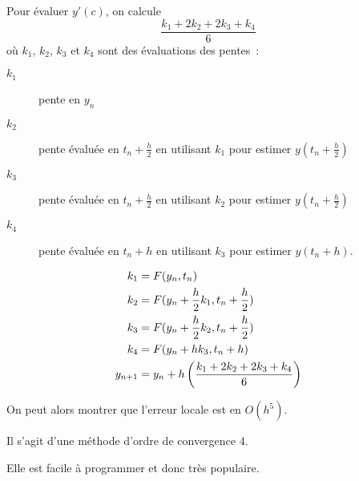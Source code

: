 Pour évaluer $y'(c)$, on calcule
\begin{equation*}
  \frac{k_{1} + 2 k_{2} + 2 k_{3} + k_{4}}{6}
\end{equation*}
où $k_{1}$, $k_{2}$, $k_{3}$ et $k_{4}$ sont des évaluations des
pentes~:
\begin{description}
\item[$k_{1}$] pente en $y_{n}$
\item[$k_2$] pente évaluée en $t_{n}+\frac{h}{2}$ en utilisant $k_{1}$
  pour estimer $y(t_{n}+\frac{h}{2})$
\item[$k_3$] pente évaluée en $t_{n}+\frac{h}{2}$ en utilisant $k_{2}$
  pour estimer $y(t_{n}+\frac{h}{2})$
\item[$k_4$] pente évaluée en $t_{n}+h$ en utilisant $k_{3}$ pour
  estimer $y(t_{n}+h)$.
\end{description}
\begin{align*}
  k_{1} &= F(y_{n}, t_{n})\\
  k_{2} &= F(y_{n} + \frac{h}{2}k_{1},t_{n} + \frac{h}{2})\\
  k_{3} &= F(y_{n} + \frac{h}{2}k_{2},t_{n}+ \frac{h}{2})\\
  k_{4} &= F(y_{n}+h k_{3},t_{n}+h)\\
  y_{n+1} &= y_{n} +h \left( \frac{k_{1}+2k_{2}+2k_{3}+k_{4}}{6}\right)
\end{align*}

On peut alors montrer que l'erreur locale est en $O(h^{5})$.

Il s'agit d'une méthode d'ordre de convergence $4$.

Elle est facile à programmer et donc très populaire.

%
%
%
%  
